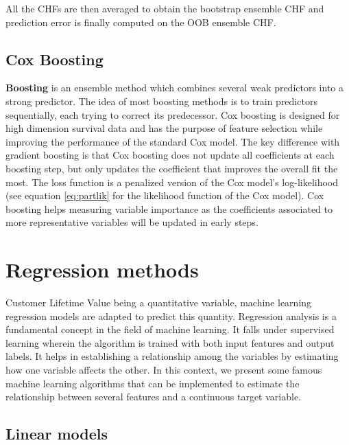 \documentclass[
]{book}
\begin{document}
All the CHFs are then averaged to obtain the bootstrap ensemble CHF and prediction error is finally computed on the OOB ensemble CHF.

\hypertarget{cox-boosting}{%
\subsection{Cox Boosting}\label{cox-boosting}}

\textbf{Boosting} is an ensemble method which combines several weak predictors into a strong predictor. The idea of most boosting methods is to train predictors sequentially, each trying to correct its predecessor. Cox boosting \citep{COX_BOOSTING} is designed for high dimension survival data and has the purpose of feature selection while improving the performance of the standard Cox model. The key difference with gradient boosting is that Cox boosting does not update all coefficients at each boosting step, but only updates the coefficient that improves the overall fit the most. The loss function is a penalized version of the Cox model's log-likelihood (see equation \eqref{eq:partlik} for the likelihood function of the Cox model). Cox boosting helps measuring variable importance as the coefficients associated to more representative variables will be updated in early steps.

\hypertarget{regression-methods}{%
\section{Regression methods}\label{regression-methods}}

Customer Lifetime Value being a quantitative variable, machine learning regression models are adapted to predict this quantity. Regression analysis is a fundamental concept in the field of machine learning. It falls under supervised learning wherein the algorithm is trained with both input features and output labels. It helps in establishing a relationship among the variables by estimating how one variable affects the other. In this context, we present some famous machine learning algorithms that can be implemented to estimate the relationship between several features and a continuous target variable.

\hypertarget{linear-models}{%
\subsection{Linear models}\label{linear-models}}
\end{document}
